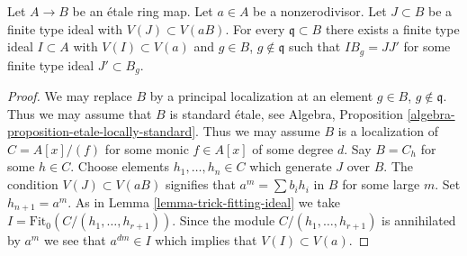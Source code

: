 \begin{lemma}
\label{lemma-push-ideal}
Let $A \to B$ be an \'etale ring map. Let $a \in A$ be a nonzerodivisor.
Let $J \subset B$ be a finite type ideal with $V(J) \subset V(aB)$.
For every $\mathfrak q \subset B$ there exists a finite type ideal
$I \subset A$ with $V(I) \subset V(a)$ and
$g \in B$, $g \not \in \mathfrak q$ such that
$IB_g = JJ'$ for some finite type ideal $J' \subset B_g$.
\end{lemma}

\begin{proof}
We may replace $B$ by a principal localization at
an element $g \in B$, $g \not \in \mathfrak q$. Thus we may assume
that $B$ is standard \'etale, see
Algebra, Proposition \ref{algebra-proposition-etale-locally-standard}.
Thus we may assume $B$ is a localization
of $C = A[x]/(f)$ for some monic $f \in A[x]$ of some degree $d$.
Say $B = C_h$ for some $h \in C$. Choose elements $h_1, \ldots, h_n \in C$
which generate $J$
over $B$. The condition $V(J) \subset V(aB)$ signifies that
$a^m = \sum b_i h_i$ in $B$ for some large $m$. Set $h_{n + 1} = a^m$.
As in Lemma \ref{lemma-trick-fitting-ideal} we take
$I = \text{Fit}_0(C/(h_1, \ldots, h_{r + 1}))$.
Since the module $C/(h_1, \ldots, h_{r + 1})$
is annihilated by $a^m$ we see that $a^{dm} \in I$ which implies
that $V(I) \subset V(a)$.
\end{proof}
